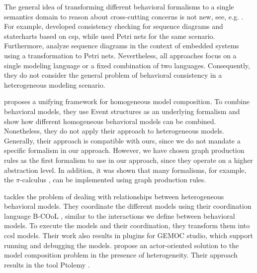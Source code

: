 \documentclass{jot}
\begin{document}
The general idea of transforming different behavioral formalisms to a single semantics domain to reason about cross-cutting concerns is not new, see, e.g. \cite{engelsMethodologySpecifyingAnalyzing2001}.
For example, \cite{kusterExplicitBehavioralConsistency2003} developed consistency checking for sequence diagrams and statecharts based on \gls*{csp}, while \cite{yaoConsistencyCheckingUML2006} used Petri nets for the same scenario.
Furthermore, \cite{cunhaFormalVerificationUML2011} analyze sequence diagrams in the context of embedded systems using a transformation to Petri nets.
Nevertheless, all approaches focus on a single modeling language or a fixed combination of two languages.
Consequently, they do not consider the general problem of behavioral consistency in a heterogeneous modeling scenario.

\cite{kienzleUnifyingFrameworkHomogeneous2019} proposes a unifying framework for homogeneous model composition.
To combine behavioral models, they use Event structures \cite{winskelEventStructures1987} as an underlying formalism and show how different homogeneous behavioral models can be combined.
Nonetheless, they do not apply their approach to heterogeneous models.
Generally, their approach is compatible with ours, since we do not mandate a specific formalism in our approach.
However, we have chosen graph production rules as the first formalism to use in our approach, since they operate on a higher abstraction level.
In addition, it was shown that many formalisms, for example, the $\pi$-calculus \cite{gadducciGraphRewritingPcalculus2007}, can be implemented using graph production rules.

\cite{deantoniModelingBehavioralSemantics2016} tackles the problem of dealing with relationships between heterogeneous behavioral models.
They coordinate the different models using their coordination language B-COoL \cite{varalarsenBCoolBehavioralCoordination2016}, similar to the interactions we define between behavioral models.
To execute the models and their coordination, they transform them into \gls*{ccsl} models.  
Their work also results in plugins for GEMOC studio, which support running and debugging the models.
\cite{ekerTamingHeterogeneityPtolemy2003, leeDisciplinedHeterogeneousModeling2010} propose an actor-oriented solution to the model composition problem in the presence of heterogeneity.
Their approach results in the tool Ptolemy \cite{ptolemaeusSystemDesignModeling2014}.
\end{document}
